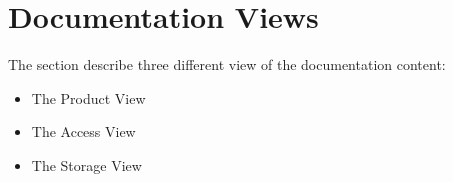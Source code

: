 \section{Documentation Views}

The section describe three different view of the documentation content:

\begin{itemize}

\item The Product View
\item The Access View
\item The Storage View

\end{itemize}
 